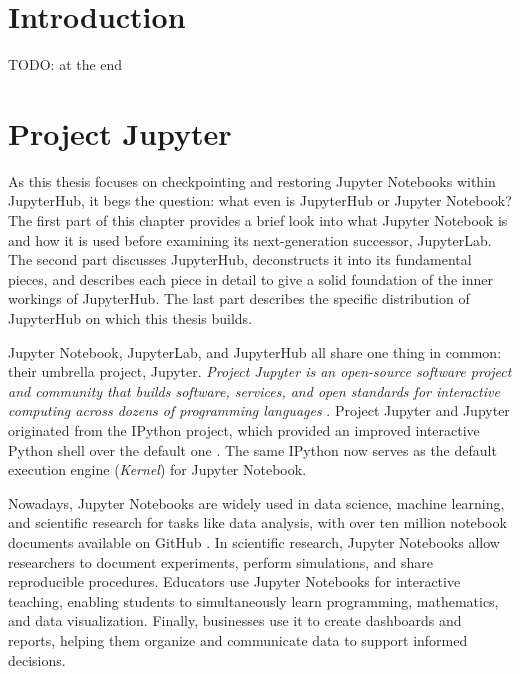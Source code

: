 \documentclass[
  digital,     %
  oneside,     %
  nosansbold,  %
  nocolorbold, %
  lof,         %
  lot,         %
]{fithesis4}
\begin{document}
\chapter*{Introduction}

TODO: at the end

\chapter{Project Jupyter}
As this thesis focuses on checkpointing and restoring Jupyter Notebooks within JupyterHub, it begs the question: what even is JupyterHub or Jupyter Notebook? The first part of this chapter provides a brief look into what Jupyter Notebook is and how it is used before examining its next-generation successor, JupyterLab. The second part discusses JupyterHub, deconstructs it into its fundamental pieces, and describes each piece in detail to give a solid foundation of the inner workings of JupyterHub. The last part describes the specific distribution of JupyterHub on which this thesis builds.

Jupyter Notebook, JupyterLab, and JupyterHub all share one thing in common: their umbrella project, Jupyter.
\emph{Project Jupyter is an open-source software project and community that builds software, services, and open standards for interactive computing across dozens of programming languages} \cite{granger2021jupyter}.
Project Jupyter and Jupyter originated from the IPython project, which provided an improved interactive Python shell over the default one \cite{ipython}. The same IPython now serves as the default execution engine (\emph{Kernel}) for Jupyter Notebook.

Nowadays, Jupyter Notebooks are widely used in data science, machine learning, and scientific research for tasks like data analysis, with over ten million notebook documents available on GitHub \cite{granger2021jupyter}. In scientific research, Jupyter Notebooks allow researchers to document experiments, perform simulations, and share reproducible procedures. Educators use Jupyter Notebooks for interactive teaching, enabling students to simultaneously learn programming, mathematics, and data visualization. 
Finally, businesses use it to create dashboards and reports, helping them organize and communicate data to support informed decisions.
\end{document}
